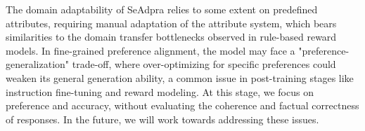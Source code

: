 The domain adaptability of SeAdpra relies to some extent on predefined attributes, requiring manual adaptation of the attribute system, which bears similarities to the domain transfer bottlenecks observed in rule-based reward models.
In fine-grained preference alignment, the model may face a "preference-generalization" trade-off, where over-optimizing for specific preferences could weaken its general generation ability, a common issue in post-training stages like instruction fine-tuning and reward modeling.
At this stage, we focus on preference and accuracy, without evaluating the coherence and factual correctness of responses. In the future, we will work towards addressing these issues.